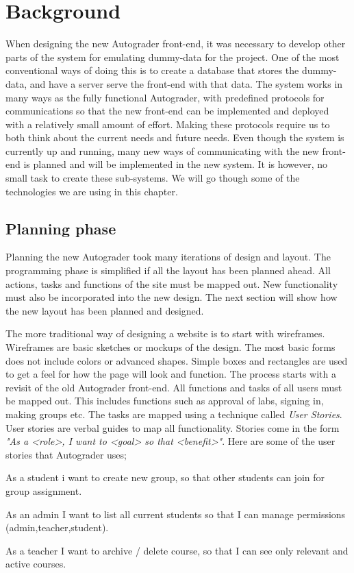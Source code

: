 \chapter{Background}
When designing the new Autograder front-end, it was necessary to develop other parts of the system for emulating dummy-data for the project. One of the most conventional ways of doing this is to create a database that stores the dummy-data, and have a server serve the front-end with that data. The system works in many ways as the fully functional Autograder, with predefined protocols for communications so that the new front-end can be implemented and deployed with a relatively small amount of effort. Making these protocols require us to both think about the current needs and future needs. Even though the system is currently up and running, many new ways of communicating with the new front-end is planned and will be implemented in the new system. It is however, no small task to create these sub-systems. We will go though some of the technologies we are using in this chapter.


\section{Planning phase}
Planning the new Autograder took many iterations of design and layout. The programming phase is simplified if all the layout has been planned ahead. All actions, tasks and functions of the site must be mapped out. New functionality must also be incorporated into the new design. The next section will show how the new layout has been planned and designed.

The more traditional way of designing a website is to start with wireframes. Wireframes are basic sketches or mockups of the design. The most basic forms does not include colors or advanced shapes. Simple boxes and rectangles are used to get a feel for how the page will look and function. The process starts with a revisit of the old Autograder front-end. All functions and tasks of all users must be mapped out. This includes functions such as approval of labs, signing in, making groups etc. The tasks are mapped using a technique called \emph{User Stories}. User stories are verbal guides to map all functionality. Stories come in the form \emph{"As a <role>, I want to <goal> so that <benefit>"}. Here are some of the user stories that Autograder uses;

\begin{itemize*}
\item As a student i want to create new group, so that other students can join for group assignment.
\item As an admin I want to list all current students so that I can manage permissions (admin,teacher,student).
\item As a teacher I want to archive / delete course, so that I can see only relevant and active courses.
\end{itemize*}


